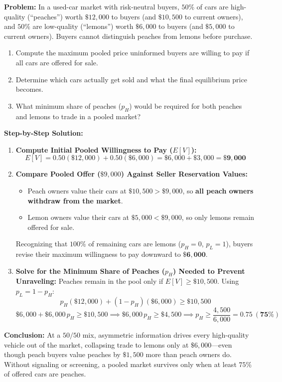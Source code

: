 \documentclass[11pt,letterpaper]{article}
\begin{document}
\begin{tcolorbox}[colback=CourseBlue!5!white,colframe=CourseBlue!80!black,title=\textbf{Work It Out: Unraveling in the Market for Lemons}]
\textbf{Problem:} In a used-car market with risk-neutral buyers, $50\%$ of cars are high-quality (``peaches'') worth $\$12{,}000$ to buyers (and $\$10{,}500$ to current owners), and $50\%$ are low-quality (``lemons'') worth $\$6{,}000$ to buyers (and $\$5{,}000$ to current owners). Buyers cannot distinguish peaches from lemons before purchase.
\begin{enumerate}
    \item Compute the maximum pooled price uninformed buyers are willing to pay if all cars are offered for sale.
    \item Determine which cars actually get sold and what the final equilibrium price becomes.
    \item What minimum share of peaches ($p_H$) would be required for both peaches and lemons to trade in a pooled market?
\end{enumerate}

\medskip
\noindent\textbf{Step-by-Step Solution:}
\begin{enumerate}
    \item \textbf{Compute Initial Pooled Willingness to Pay ($E[V]$):}
    \[
    E[V] = 0.50(\$12{,}000) + 0.50(\$6{,}000) = \$6{,}000 + \$3{,}000 = \mathbf{\$9{,}000}
    \]

    \item \textbf{Compare Pooled Offer ($\$9{,}000$) Against Seller Reservation Values:}
    \begin{itemize}
        \item Peach owners value their cars at $\$10{,}500 > \$9{,}000$, so \textbf{all peach owners withdraw from the market}.
        \item Lemon owners value their cars at $\$5{,}000 < \$9{,}000$, so only lemons remain offered for sale.
    \end{itemize}
    Recognizing that $100\%$ of remaining cars are lemons ($p_H = 0$, $p_L = 1$), buyers revise their maximum willingness to pay downward to $\mathbf{\$6{,}000}$.

    \item \textbf{Solve for the Minimum Share of Peaches ($p_H$) Needed to Prevent Unraveling:}
    Peaches remain in the pool only if $E[V] \ge \$10{,}500$. Using $p_L = 1 - p_H$:
    \[
    p_H(\$12{,}000) + (1 - p_H)(\$6{,}000) \ge \$10{,}500
    \]
    \[
    \$6{,}000 + \$6{,}000\,p_H \ge \$10{,}500 \implies \$6{,}000\,p_H \ge \$4{,}500 \implies p_H \ge \frac{4{,}500}{6{,}000} = \mathbf{0.75\ (75\%)}
    \]
\end{enumerate}
\textbf{Conclusion:} At a $50/50$ mix, asymmetric information drives every high-quality vehicle out of the market, collapsing trade to lemons only at $\$6{,}000$—even though peach buyers value peaches by $\$1{,}500$ more than peach owners do. Without signaling or screening, a pooled market survives only when at least $75\%$ of offered cars are peaches.
\end{tcolorbox}
\end{document}
